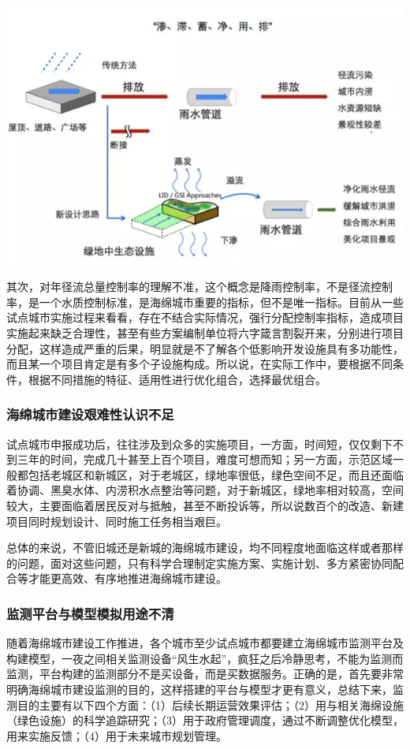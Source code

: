 \documentclass[]{book}
\begin{document}
\includegraphics[width=8.33in]{images/hm4}

其次，对年径流总量控制率的理解不准，这个概念是降雨控制率，不是径流控制率，是一个水质控制标准，是海绵城市重要的指标，但不是唯一指标。目前从一些试点城市实施过程来看看，存在不结合实际情况，强行分配控制率指标，造成项目实施起来缺乏合理性，甚至有些方案编制单位将六字箴言割裂开来，分别进行项目分配，这样造成严重的后果，明显就是不了解各个低影响开发设施具有多功能性，而且某一个项目肯定是有多个子设施构成。所以说，在实际工作中，要根据不同条件，根据不同措施的特征、适用性进行优化组合，选择最优组合。

\subsubsection{海绵城市建设艰难性认识不足}

试点城市申报成功后，往往涉及到众多的实施项目，一方面，时间短，仅仅剩下不到三年的时间，完成几十甚至上百个项目，难度可想而知；另一方面，示范区域一般都包括老城区和新城区，对于老城区，绿地率很低，绿色空间不足，而且还面临着协调、黑臭水体、内涝积水点整治等问题，对于新城区，绿地率相对较高，空间较大，主要面临着居民反对与抵触，甚至不断投诉等，所以说数百个的改造、新建项目同时规划设计、同时施工任务相当艰巨。

总体的来说，不管旧城还是新城的海绵城市建设，均不同程度地面临这样或者那样的问题，面对这些问题，只有科学合理制定实施方案、实施计划、多方紧密协同配合等才能更高效、有序地推进海绵城市建设。

\subsubsection{监测平台与模型模拟用途不清}

随着海绵城市建设工作推进，各个城市至少试点城市都要建立海绵城市监测平台及构建模型，一夜之间相关监测设备``风生水起''，疯狂之后冷静思考，不能为监测而监测，平台构建的监测部分不是买设备，而是买数据服务。正确的是，首先要非常明确海绵城市建设监测的目的，这样搭建的平台与模型才更有意义，总结下来，监测目的主要有以下四个方面：（1）后续长期运营效果评估；（2）用与相关海绵设施（绿色设施）的科学追踪研究；（3）用于政府管理调度，通过不断调整优化模型，用来实施反馈；（4）用于未来城市规划管理。
\end{document}
